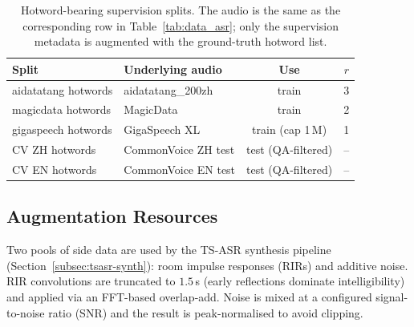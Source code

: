 \begin{table}[t]
  \caption{Hotword-bearing supervision splits. The audio is the same
    as the corresponding row in Table~\ref{tab:data_asr}; only the
    supervision metadata is augmented with the ground-truth hotword
    list.}
  \label{tab:data_hotwords}
  \centering
  \small
  \begin{tabular}{llcr}
    \toprule
    Split & Underlying audio & Use & $r$ \\
    \midrule
    aidatatang hotwords    & aidatatang\_200zh & train & 3 \\
    magicdata hotwords     & MagicData         & train & 2 \\
    gigaspeech hotwords    & GigaSpeech XL     & train (cap 1\,M) & 1 \\
    \midrule
    CV ZH hotwords         & CommonVoice ZH test & test (QA-filtered) & -- \\
    CV EN hotwords         & CommonVoice EN test & test (QA-filtered) & -- \\
    \bottomrule
  \end{tabular}
\end{table}

\subsection{Augmentation Resources}
\label{subsec:aug-resources}

Two pools of side data are used by the TS-ASR synthesis pipeline
(Section~\ref{subsec:tsasr-synth}): room impulse responses (RIRs) and
additive noise. RIR convolutions are truncated to $1.5$\,s (early
reflections dominate intelligibility) and applied via an FFT-based
overlap-add. Noise is mixed at a configured signal-to-noise ratio
(SNR) and the result is peak-normalised to avoid clipping.

